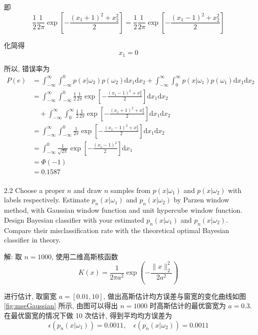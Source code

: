 \documentclass[openany]{ctexbook}
\theoremstyle{kaiti}
\theoremstyle{normal}
\begin{document}
即
\begin{equation}
  \frac{1}{2}\frac{1}{2\pi}\exp\left[-\frac{(x_1+1)^2+x_2^2}{2}\right]=\frac{1}{2}\frac{1}{2\pi}\exp\left[-\frac{(x_1-1)^2+x_2^2}{2}\right]
\end{equation}

化简得
\begin{equation}
  x_1=0
\end{equation}

所以, 错误率为
\begin{equation}
  \begin{aligned}
    P(e)
    &=\int_{-\infty}^\infty\int_{-\infty}^0 p(x|\omega_{2})p(\omega_{2})\mathrm{d}x_1\mathrm{d}x_2+\int_{-\infty}^\infty\int_0^\infty p(x|\omega_{1})p(\omega_{1})\mathrm{d}x_1\mathrm{d}x_2\\
    &=\int_{-\infty}^\infty\int_{-\infty}^0\frac{1}{2}\frac{1}{2\pi}\exp\left[-\frac{(x_1-1)^2+x_2^2}{2}\right]\mathrm{d}x_1\mathrm{d}x_2\\
    &\quad+\int_{-\infty}^\infty\int_0^\infty\frac{1}{2}\frac{1}{2\pi}\exp\left[-\frac{(x_1+1)^2+x_2^2}{2}\right]\mathrm{d}x_1\mathrm{d}x_2\\
    &=\int_{-\infty}^\infty\int_{-\infty}^0\frac{1}{2\pi}\exp\left[-\frac{(x_1-1)^2+x_2^2}{2}\right]\mathrm{d}x_1\mathrm{d}x_2\\
    &=\int_{-\infty}^0\frac{1}{\sqrt{2\pi}}\exp\left[-\frac{(x_1-1)^2}{2}\right]\mathrm{d}x_1\\
    &=\Phi(-1)\\
    &=0.1587\\
  \end{aligned}
\end{equation}

2.2 Choose a proper $n$ and draw $n$ samples from $p(x|\omega_{1})$ and $p(x|\omega_{2})$ with labels respectively. Estimate $p_{n}(x|\omega_{1})$ and $p_{n}(x|\omega_{2})$ by Parzen window method, with Gaussian window function and unit hypercube window function. Design Bayesian classifier with your estimated $p_{n}(x|\omega_{1})$ and $p_{n}(x|\omega_{2})$. Compare their misclassification rate with the theoretical optimal Bayesian classifier in theory.

解: 取 $n=1000$, 使用二维高斯核函数
\begin{equation}
  K(x)=\frac{1}{2\pi a^2}\exp\left(-\frac{\|x\|_2^2}{2a^2}\right)
\end{equation}

进行估计, 取窗宽 $a=[0.01,10]$, 做出高斯估计均方误差与窗宽的变化曲线如图 \ref{fig:mseGaussian} 所示, 由图可以得出 $n=1000$ 时高斯估计的最优窗宽为 $a=0.3$. 在最优窗宽的情况下做 10 次估计, 得到平均均方误差为
\begin{equation}
  \epsilon(p_n(x|\omega_1))=0.0011,\quad\epsilon(p_n(x|\omega_2))=0.0011
\end{equation}
\end{document}
